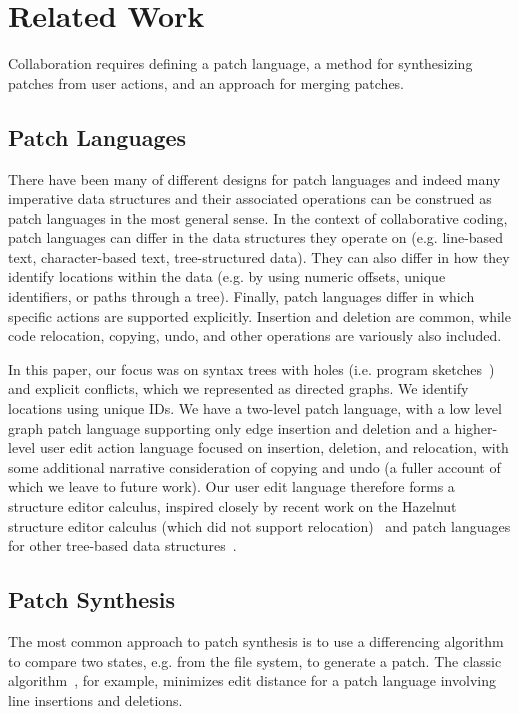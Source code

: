 
\section{Related Work}%
\label{sec:Related Work}

Collaboration requires defining a patch language, a method for synthesizing patches from user actions, and an approach for merging patches.

\subsection{Patch Languages}
There have been many of different designs for patch languages and indeed many imperative data structures and their associated operations can be construed as patch languages in the most general sense. In the context of collaborative coding, patch languages can differ in the data structures they operate on (e.g. line-based text, character-based text, tree-structured data). 
They can also differ in how they identify locations within the data (e.g. by using numeric offsets, unique identifiers, or paths through a tree).
Finally, patch languages differ in which specific actions are supported explicitly. Insertion and deletion are common, while code relocation, copying, undo, and other operations are variously also included.

In this paper, our focus was on syntax trees with holes (i.e. program sketches~\cite{DBLP:conf/aplas/Solar-Lezama09, DBLP:conf/popl/OmarVHAH17}) and explicit conflicts, which we represented as directed graphs. We identify locations using unique IDs. We have a two-level patch language, with a low level graph patch language supporting only edge insertion and deletion and a higher-level user edit action language focused on insertion, deletion, and relocation, with some additional narrative consideration of copying and undo (a fuller account of which we leave to future work).  Our user edit language therefore forms a structure editor calculus, inspired closely by recent work on the Hazelnut structure editor calculus (which did not support relocation)~\cite{DBLP:conf/popl/OmarVHAH17} and patch languages for other tree-based data structures~\cite{DBLP:conf/sigmod/ChawatheG97, DBLP:journals/tse/FluriWPG07,DBLP:conf/kbse/FalleriMBMM14,DBLP:conf/doceng/Lindholm04,DBLP:conf/fase/NguyenNPN10,DBLP:journals/scp/SchwagerlUW15}.

\subsection{Patch Synthesis}
The most common approach to patch synthesis is to use a differencing algorithm to compare two states, e.g. from the file system, to generate a patch. 
The classic  algorithm~\cite{DiffAlgorithm}, for example, minimizes edit distance for a patch language involving line insertions and deletions.

